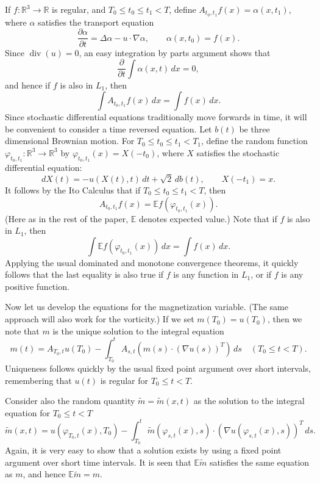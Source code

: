 \documentclass[12pt]{amsart}
\theoremstyle{remark}
\newcommand{\E}{{\mathbb E}}
\newcommand{\R}{{\mathbb R}}
\DeclareMathOperator{\divergence}{div}
\begin{document}
If $f\colon\R^3 \to \R$ is regular, and
$T_0 \le t_0 \le t_1 < T$,
define $A_{t_0,t_1} f(x) = \alpha(x,t_1)$, where 
$\alpha$ satisfies the transport equation
$$ \frac{\partial\alpha}{\partial t} = \Delta \alpha - u\cdot\nabla \alpha,
   \qquad
   \alpha(x,t_0) = f(x) .$$
Since $\divergence(u) = 0$, an easy integration by parts argument shows
that
$$ \frac\partial{\partial t} \int \alpha(x,t) \, dx = 0 ,$$
and hence if $f$ is also in $L_1$, then
$$ \int A_{t_0,t_1} f(x) \, dx = \int f(x) \, dx .$$
Since stochastic
differential equations traditionally move forwards in time, it will be 
convenient to consider a time reversed equation.
Let $b(t)$ be three dimensional Brownian motion.
For $T_0 \le t_0 \le t_1 < T_1$, define the random function
$\varphi_{t_0,t_1}\colon\R^3\to\R^3$ by
$\varphi_{t_0,t_1}(x) = X(-t_0)$, where $X$ satisfies the 
stochastic differential equation:
$$ dX(t) = -u(X(t),t) \, dt + \sqrt2 \, db(t),
   \qquad
   X(-t_1) = x .$$
It follows by the Ito Calculus \cite{karatzas-shreve} that
if $T_0 \le t_0 \le t_1 < T$, then
$$ A_{t_0,t_1} f(x) = \E f(\varphi_{t_0,t_1}(x)) .$$
(Here as in the rest of the paper, $\E$ denotes expected value.)
Note that if $f$ is also in $L_1$, then
$$ \int \E f(\varphi_{t_0,t_1}(x)) \, dx = \int f(x) \, dx .$$
Applying the usual dominated and monotone convergence theorems, it
quickly follows that the last equality is also true if $f$ is any
function in $L_1$, or if $f$
is any positive function.

Now let us develop the equations for the magnetization variable.  (The same
approach will also work for the vorticity.)
If we set $m(T_0) = u(T_0)$, then
we note that $m$ is the unique solution to the integral
equation
$$ m(t) = A_{T_0,t} u(T_0) - 
   \int_{T_0}^t A_{s,t} (m(s) \cdot (\nabla u(s))^T) \, ds 
   \quad (T_0 \le t < T).$$
Uniqueness follows quickly by the usual fixed point argument
over short intervals, 
remembering that $u(t)$ is regular for $T_0 \le t < T$.

Consider also the random quantity
$\tilde m = \tilde m(x,t)$ as the solution to the integral equation
for $T_0 \le t < T$
$$ \tilde m(x,t) = u(\varphi_{T_0,t}(x),T_0) -
   \int_{T_0}^t \tilde 
   m(\varphi_{s,t}(x),s) \cdot (\nabla u(\varphi_{s,t}(x),s))^T \, ds .$$
Again, 
it is very easy to show that a solution exists by using a fixed point
argument over short time intervals.
It is seen that $\E\tilde m$ satisfies the same equation as $m$, and
hence $\E \tilde m = m$.
\end{document}
